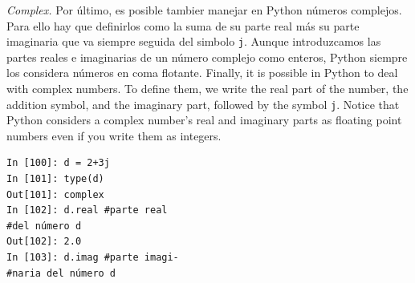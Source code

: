 \begin{paracol}{2}        
\emph{Complex.} Por último, es posible tambier manejar en Python números complejos. Para ello hay que definirlos como la suma de su parte real más su parte imaginaria que va siempre seguida del simbolo \texttt{j}. Aunque introduzcamos las partes reales e imaginarias de un número complejo como enteros, Python siempre los considera números en coma flotante.
\switchcolumn Finally, it is possible in Python to deal with complex numbers. To define them, we write the real part of the number, the addition symbol, and the imaginary part, followed by the symbol \texttt{j}. Notice that Python considers a complex number's real and imaginary parts as floating point numbers even if you write them as integers.  
\end{paracol}

\begin{center}
\begin{minipage}{0.2\textwidth}
\begin{verbatim}
In [100]: d = 2+3j
In [101]: type(d)
Out[101]: complex
In [102]: d.real #parte real
#del número d
Out[102]: 2.0
In [103]: d.imag #parte imagi-
#naria del número d
\end{verbatim}
\end{minipage}
\end{center}


\begin{figure}
\end{figure}

